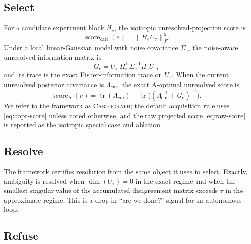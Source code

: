 \documentclass{article}
\newcommand{\method}{\textsc{Cartograph}}
\newcommand{\scorecart}{\operatorname{score}_{\mathrm{cart}}}
\newcommand{\scoreaopt}{\operatorname{score}_{\mathrm{A}}}
\newcommand{\tr}{\operatorname{tr}}
\newcommand{\norm}[1]{\left\lVert #1 \right\rVert}
\theoremstyle{plain}
\theoremstyle{definition}
\theoremstyle{remark}
\begin{document}
\subsection{Select}

For a candidate experiment block $H_e$, the isotropic unresolved-projection
score is
\begin{equation}
\scorecart(e) = \norm{H_e U_\tau}_F^2.
\label{eq:raw-score}
\end{equation}
Under a local linear-Gaussian model with noise covariance $\Sigma_e$, the
noise-aware unresolved information matrix is
\begin{equation}
G_e = U_\tau^\top H_e^\top \Sigma_e^{-1} H_e U_\tau,
\label{eq:Ge}
\end{equation}
and its trace is the exact Fisher-information trace on $U_\tau$. When the
current unresolved posterior covariance is $\Lambda_{\mathrm{cur}}$, the
exact A-optimal unresolved score is
\begin{equation}
\scoreaopt(e) = \tr(\Lambda_{\mathrm{cur}})-\tr\!\big((\Lambda_{\mathrm{cur}}^{-1}+G_e)^{-1}\big).
\label{eq:aopt-score}
\end{equation}
We refer to the framework as \method; the default acquisition rule uses
\eqref{eq:aopt-score} unless noted otherwise, and the raw projected score
\eqref{eq:raw-score} is reported as the isotropic special case and ablation.

\subsection{Resolve}

The framework certifies resolution from the same object it uses to select.
Exactly, ambiguity is resolved when $\dim(U_\tau)=0$ in the exact regime and
when the smallest singular value of the accumulated disagreement matrix
exceeds $\tau$ in the approximate regime. This is a drop-in ``are we done?''
signal for an autonomous loop.

\subsection{Refuse}
\end{document}
